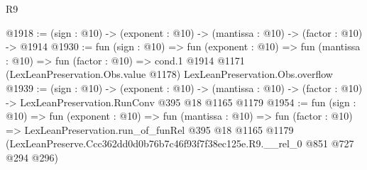\begin{lexlean}{R9}
\begin{coremodule}
@1918 := (sign : @10) -> (exponent : @10) -> (mantissa : @10) -> (factor : @10) -> @1914
@1930 := fun (sign : @10) =>
  fun (exponent : @10) =>
  fun (mantissa : @10) =>
  fun (factor : @10) =>
  cond.{1} @1914 @1171 (LexLeanPreservation.Obs.value @1178) LexLeanPreservation.Obs.overflow
@1939 := (sign : @10) ->
  (exponent : @10) ->
  (mantissa : @10) -> (factor : @10) -> LexLeanPreservation.RunConv @395 @18 @1165 @1179
@1954 := fun (sign : @10) =>
  fun (exponent : @10) =>
  fun (mantissa : @10) =>
  fun (factor : @10) =>
  LexLeanPreservation.run_of_funRel
    @395
    @18
    @1165
    @1179
    (LexLeanPreserve.Ccc362dd0d0b76b7c46f93f7f38ec125e.R9.__rel_0 @851 @727 @294 @296)
\end{coremodule}
\end{lexlean}

